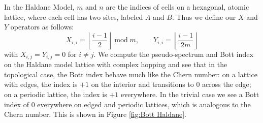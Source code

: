 \documentclass[a4paper]{article}
\begin{document}
In the Haldane Model, $m$ and $n$ are the indices of cells on a hexagonal, atomic lattice, where each cell has two sites, labeled $A$ and $B$.
Thus we define our $X$ and $Y$ operators as follows:
$$X_{i,i} = \left\lfloor \frac{i-1}{2} \right\rfloor \;\text{mod}\;m, \quad\quad Y_{i,i} = \left\lfloor \frac{i-1}{2m} \right\rfloor$$
with $X_{i,j} = Y_{i,j} = 0$ for $i \neq j$. 
We compute the pseudo-spectrum and Bott index on the Haldane model lattice with complex hopping and see that in the topological case, the Bott index behave much like the Chern number:
on a lattice with edges, the index is $+1$ on the interior and transitions to 0 across the edge;
on a periodic lattice, the index is $+1$ everywhere.
In the trivial case we see a Bott index of 0 everywhere on edged and periodic lattices, which is analogous to the Chern number.
This is shown in Figure \ref{fig:Bott Haldane}.
\end{document}
